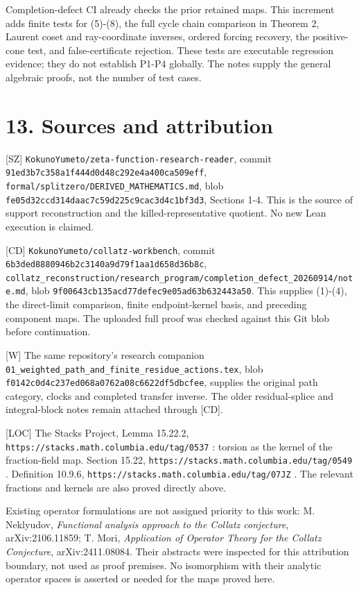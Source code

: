 Completion-defect CI already checks the prior retained maps. This
increment adds finite tests for (5)-(8), the full cycle chain comparison
in Theorem 2, Laurent coset and ray-coordinate inverses, ordered forcing
recovery, the positive-cone test, and false-certificate rejection. These
tests are executable regression evidence; they do not establish P1-P4
globally. The notes supply the general algebraic proofs, not the number
of test cases.

\section{13. Sources and attribution}

{[}SZ{]} \nolinkurl{KokunoYumeto/zeta-function-research-reader}, commit
\nolinkurl{91ed3b7c358a1f444d0d48c292e4a400ca509eff},
\nolinkurl{formal/splitzero/DERIVED_MATHEMATICS.md}, blob
\nolinkurl{fe05d32ccd314daac7c59d225c9cac3d4c1bf3d3}, Sections 1-4. This
is the source of support reconstruction and the killed-representative
quotient. No new Lean execution is claimed.

{[}CD{]} \nolinkurl{KokunoYumeto/collatz-workbench}, commit
\nolinkurl{6b3ded8880946b2c3140a9d79f1aa1d658d36b8c},
\nolinkurl{collatz_reconstruction/research_program/completion_defect_20260914/note.md},
blob \nolinkurl{9f00643cb135acd77defec9e05ad63b632443a50}. This supplies
(1)-(4), the direct-limit comparison, finite endpoint-kernel basis, and
preceding component maps. The uploaded full proof was checked against
this Git blob before continuation.

{[}W{]} The same repository's research companion
\nolinkurl{01_weighted_path_and_finite_residue_actions.tex}, blob
\nolinkurl{f0142c0d4c237ed068a0762a08c6622df5dbcfee}, supplies the
original path category, clocks and completed transfer inverse. The older
residual-splice and integral-block notes remain attached through
{[}CD{]}.

{[}LOC{]} The Stacks Project, Lemma 15.22.2,
\nolinkurl{https://stacks.math.columbia.edu/tag/0537} : torsion as the
kernel of the fraction-field map. Section 15.22,
\nolinkurl{https://stacks.math.columbia.edu/tag/0549} . Definition
10.9.6, \nolinkurl{https://stacks.math.columbia.edu/tag/07JZ} . The
relevant fractions and kernels are also proved directly above.

Existing operator formulations are not assigned priority to this work:
M. Neklyudov, \emph{Functional analysis approach to the Collatz
conjecture}, arXiv:2106.11859; T. Mori, \emph{Application of Operator
Theory for the Collatz Conjecture}, arXiv:2411.08084. Their abstracts
were inspected for this attribution boundary, not used as proof
premises. No isomorphism with their analytic operator spaces is asserted
or needed for the maps proved here.
